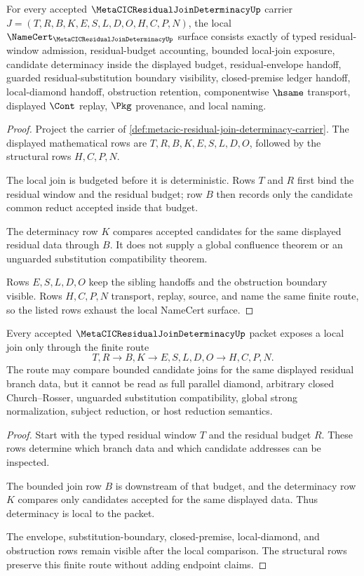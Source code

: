 \begin{theorem}
\label{thm:metacic-residual-join-determinacy-obligations}
For every accepted $\MetaCICResidualJoinDeterminacyUp$ carrier $J=(T,R,B,K,E,S,L,D,O,H,C,P,N)$, the local $\NameCert_{\MetaCICResidualJoinDeterminacyUp}$ surface consists exactly of typed residual-window admission, residual-budget accounting, bounded local-join exposure, candidate determinacy inside the displayed budget, residual-envelope handoff, guarded residual-substitution boundary visibility, closed-premise ledger handoff, local-diamond handoff, obstruction retention, componentwise $\hsame$ transport, displayed $\Cont$ replay, $\Pkg$ provenance, and local naming.
\end{theorem}
\begin{proof}
Project the carrier of \autoref{def:metacic-residual-join-determinacy-carrier}. The displayed mathematical rows are $T,R,B,K,E,S,L,D,O$, followed by the structural rows $H,C,P,N$.

The local join is budgeted before it is deterministic. Rows $T$ and $R$ first bind the residual window and the residual budget; row $B$ then records only the candidate common reduct accepted inside that budget.

The determinacy row $K$ compares accepted candidates for the same displayed residual data through $B$. It does not supply a global confluence theorem or an unguarded substitution compatibility theorem.

Rows $E,S,L,D,O$ keep the sibling handoffs and the obstruction boundary visible. Rows $H,C,P,N$ transport, replay, source, and name the same finite route, so the listed rows exhaust the local NameCert surface.
\end{proof}

\begin{theorem}
\label{thm:metacic-residual-join-determinacy-budgeted-local-join}
Every accepted $\MetaCICResidualJoinDeterminacyUp$ packet exposes a local join only through the finite route
$$
T,R \longrightarrow B,K \longrightarrow E,S,L,D,O \longrightarrow H,C,P,N .
$$
The route may compare bounded candidate joins for the same displayed residual branch data, but it cannot be read as full parallel diamond, arbitrary closed Church--Rosser, unguarded substitution compatibility, global strong normalization, subject reduction, or host reduction semantics.
\end{theorem}
\begin{proof}
Start with the typed residual window $T$ and the residual budget $R$. These rows determine which branch data and which candidate addresses can be inspected.

The bounded join row $B$ is downstream of that budget, and the determinacy row $K$ compares only candidates accepted for the same displayed data. Thus determinacy is local to the packet.

The envelope, substitution-boundary, closed-premise, local-diamond, and obstruction rows remain visible after the local comparison. The structural rows preserve this finite route without adding endpoint claims.
\end{proof}


